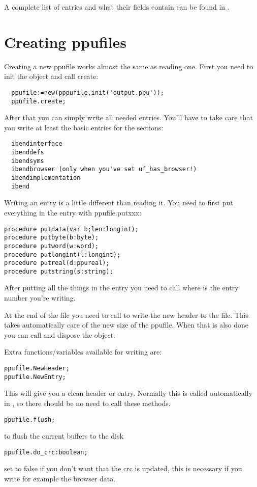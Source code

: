 A complete list of entries and what their fields contain can be found
in .

\section{Creating ppufiles}
Creating a new ppufile works almost the same as reading one.
First you need to init the object and call create:
\begin{verbatim}
  ppufile:=new(pppufile,init('output.ppu'));
  ppufile.create;
\end{verbatim}

After that you can simply write all needed entries. You'll have to take
care that you write at least the basic entries for the sections:
\begin{verbatim}
  ibendinterface
  ibenddefs
  ibendsyms
  ibendbrowser (only when you've set uf_has_browser!)
  ibendimplementation
  ibend
\end{verbatim}

Writing an entry is a little different than reading it. You need to first
put everything in the entry with ppufile.putxxx:
\begin{verbatim}
procedure putdata(var b;len:longint);
procedure putbyte(b:byte);
procedure putword(w:word);
procedure putlongint(l:longint);
procedure putreal(d:ppureal);
procedure putstring(s:string);
\end{verbatim}

After putting all the things in the entry you need to call
 where  is the entry number
you're writing.

At the end of the file you need to call  to write the
new header to the file. This takes automatically care of the new size of the
ppufile. When that is also done you can call  and dispose the
object.

Extra functions/variables available for writing are:
\begin{verbatim}
ppufile.NewHeader;
ppufile.NewEntry;
\end{verbatim}
This will give you a clean header or entry. Normally this is called
automatically in , so there should be no need to
call these methods.
\begin{verbatim}
ppufile.flush;
\end{verbatim}

to flush the current buffers to the disk
\begin{verbatim}
ppufile.do_crc:boolean;
\end{verbatim}
set to false if you don't want that the crc is updated, this is necessary
if you write for example the browser data.

